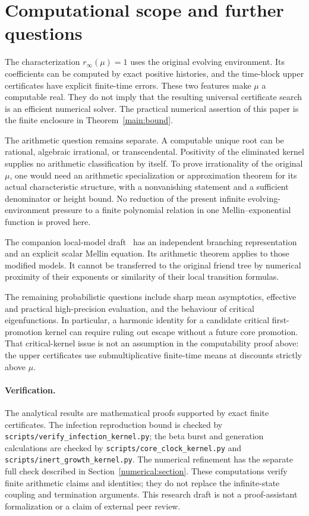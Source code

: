 \section{Computational scope and further questions}
\label{discussion:section}

The characterization $r_\infty(\mu)=1$ uses the original evolving
environment. Its coefficients can be computed by exact positive
histories, and the time-block upper certificates have explicit
finite-time errors. These two features make $\mu$ a computable real.
They do not imply that the resulting universal certificate search is
an efficient numerical solver. The practical numerical assertion of
this paper is the finite enclosure in Theorem~\ref{main:bound}.

The arithmetic question remains separate. A computable unique root
can be rational, algebraic irrational, or transcendental. Positivity
of the eliminated kernel supplies no arithmetic classification by
itself. To prove irrationality of the original $\mu$, one would need
an arithmetic specialization or approximation theorem for its actual
characteristic structure, with a nonvanishing statement and a
sufficient denominator or height bound. No reduction of the present
infinite evolving-environment pressure to a finite polynomial relation
in one Mellin--exponential function is proved here.

The companion local-model draft~\cite{Local} has an independent
branching representation and an explicit scalar Mellin equation. Its
arithmetic theorem applies to those modified models. It cannot be
transferred to the original friend tree by numerical proximity of
their exponents or similarity of their local transition formulas.

The remaining probabilistic questions include sharp mean asymptotics,
effective and practical high-precision evaluation, and the behaviour
of critical eigenfunctions. In particular, a harmonic identity for
a candidate critical first-promotion kernel can require ruling out
escape without a future core promotion. That critical-kernel issue
is not an assumption in the computability proof above: the upper
certificates use submultiplicative finite-time means at discounts
strictly above $\mu$.

\paragraph{Verification.}
The analytical results are mathematical proofs supported by exact
finite certificates. The infection reproduction bound is checked by
\texttt{scripts/verify\_infection\_kernel.py}; the beta burst and
generation calculations are checked by
\texttt{scripts/core\_clock\_kernel.py} and
\texttt{scripts/inert\_growth\_kernel.py}. The numerical refinement
has the separate full check described in Section~\ref{numerical:section}.
These computations verify finite arithmetic claims and identities;
they do not replace the infinite-state coupling and termination
arguments. This research draft is not a proof-assistant formalization
or a claim of external peer review.

